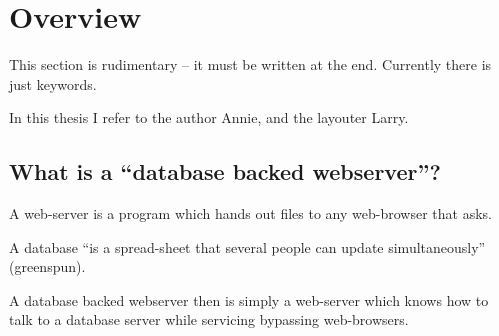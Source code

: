 
\chapter{Overview}


\textsf{This section is rudimentary -- it must be written at the end.
  Currently there is just keywords.}

\textsf{In this thesis I refer to the author Annie, and the layouter
  Larry.}

\section{What is a ``database backed webserver''?}

A web-server is a program which hands out files to any web-browser
that asks.

A database ``is a spread-sheet that several people can update
simultaneously'' (\textsf{greenspun}).

A database backed webserver then is simply a web-server which knows how
to talk to a database server while servicing bypassing web-browsers.






